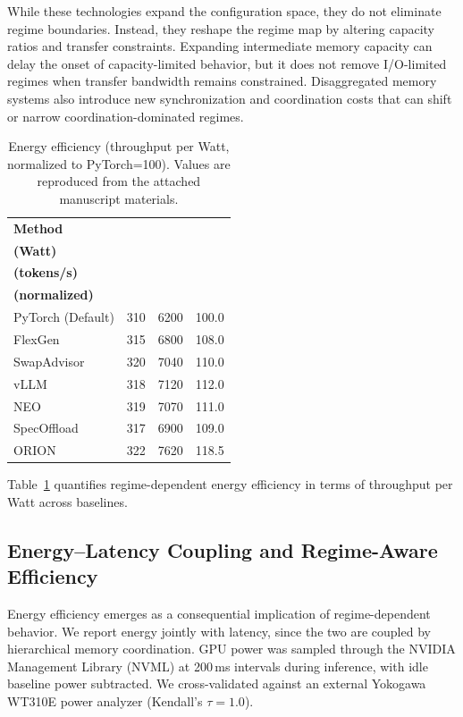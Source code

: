 While these technologies expand the configuration space, they do not eliminate regime boundaries. Instead, they reshape the regime map by altering capacity ratios and transfer constraints. Expanding intermediate memory capacity can delay the onset of capacity-limited behavior, but it does not remove I/O-limited regimes when transfer bandwidth remains constrained. Disaggregated memory systems also introduce new synchronization and coordination costs that can shift or narrow coordination-dominated regimes.

\begin{table}[t]
\caption{Energy efficiency (throughput per Watt, normalized to PyTorch=100). Values are reproduced from the attached manuscript materials.}
\centering
\begin{tabular}{|l|c|c|c|}
\hline
\textbf{Method} & 
\makecell{\textbf{Avg. Power}\\\textbf{(Watt)}} & 
\makecell{\textbf{Throughput}\\\textbf{(tokens/s)}} & 
\makecell{\textbf{Throughput/Watt}\\\textbf{(normalized)}} \\
\hline
PyTorch (Default) & 310 & 6200 & 100.0 \\
FlexGen \cite{flexgen2023}           & 315 & 6800 & 108.0 \\
SwapAdvisor \cite{huang2020swapadvisor}       & 320 & 7040 & 110.0 \\
vLLM \cite{kwon2023pagedattention}              & 318 & 7120 & 112.0 \\
NEO               & 319 & 7070 & 111.0 \\
SpecOffload       & 317 & 6900 & 109.0 \\
ORION             & 322 & 7620 & 118.5 \\
\hline
\end{tabular}
\label{tab:energy}
\end{table}

Table~\ref{tab:energy} quantifies regime-dependent energy efficiency in terms of throughput per Watt across baselines.
\subsection{Energy--Latency Coupling and Regime-Aware Efficiency}
Energy efficiency emerges as a consequential implication of regime-dependent behavior. We report energy jointly with latency, since the two are coupled by hierarchical memory coordination. GPU power was sampled through the NVIDIA Management Library (NVML) at 200\,ms intervals during inference, with idle baseline power subtracted. We cross-validated against an external Yokogawa WT310E power analyzer (Kendall's $\tau = 1.0$).

